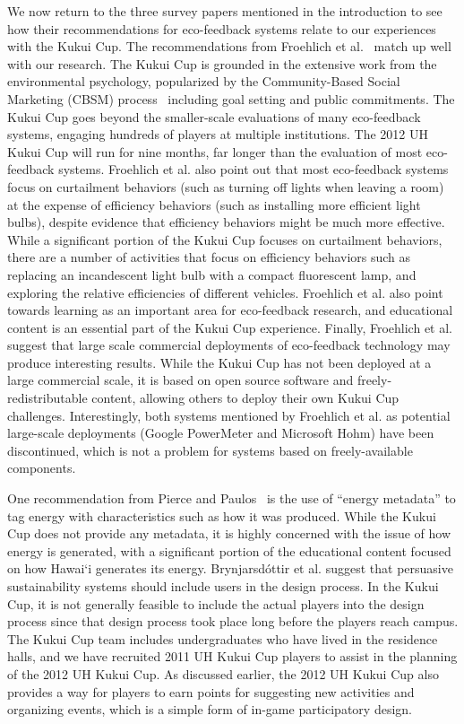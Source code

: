\documentclass{sigchi}
\newcommand{\Hawaii}{Hawai`i\xspace}
\begin{document}
We now return to the three survey papers mentioned in the introduction to see how their recommendations for eco-feedback systems relate to our experiences with the Kukui Cup. The recommendations from Froehlich et al.~\cite{Froehlich2010} match up well with our research. The Kukui Cup is grounded in the extensive work from the environmental psychology, popularized by the Community-Based Social Marketing (CBSM) process~\cite{McKenzie-Mohr2009} including goal setting and public commitments. The Kukui Cup goes beyond the smaller-scale evaluations of many eco-feedback systems, engaging hundreds of players at multiple institutions. The 2012 UH Kukui Cup will run for nine months, far longer than the evaluation of most eco-feedback systems. Froehlich et al. also point out that most eco-feedback systems focus on curtailment behaviors (such as turning off lights when leaving a room) at the expense of efficiency behaviors (such as installing more efficient light bulbs), despite evidence that efficiency behaviors might be much more effective. While a significant portion of the Kukui Cup focuses on curtailment behaviors, there are a number of activities that focus on efficiency behaviors such as replacing an incandescent light bulb with a compact fluorescent lamp, and exploring the relative efficiencies of different  vehicles. Froehlich et al. also point towards learning as an important area for eco-feedback research, and educational content is an essential part of the Kukui Cup experience. Finally, Froehlich et al. suggest that large scale commercial deployments of eco-feedback technology may produce interesting results. While the Kukui Cup has not been deployed at a large commercial scale, it is based on open source software and freely-redistributable content, allowing others to deploy their own Kukui Cup challenges. Interestingly, both systems mentioned by Froehlich et al. as potential large-scale deployments (Google PowerMeter and Microsoft Hohm) have been discontinued, which is not a problem for systems based on freely-available components.

One recommendation from Pierce and Paulos~\cite{Pierce2012-BEM} is the use of ``energy metadata'' to tag energy with characteristics such as how it was produced. While the Kukui Cup does not provide any metadata, it is highly concerned with the issue of how energy is generated, with a significant portion of the educational content focused on how \Hawaii generates its energy. Brynjarsd\'{o}ttir et al. suggest that persuasive sustainability systems should include users in the design process. In the Kukui Cup, it is not generally feasible to include the actual players into the design process since that design process took place long before the players reach campus. The Kukui Cup team includes undergraduates who have lived in the residence halls, and we have recruited 2011 UH Kukui Cup players to assist in the planning of the 2012 UH Kukui Cup. As discussed earlier, the 2012 UH Kukui Cup also provides a way for players to earn points for suggesting new activities and organizing events, which is a simple form of in-game participatory design.
\end{document}
